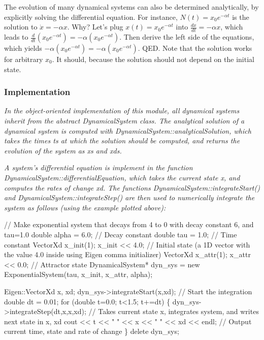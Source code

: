 The evolution of many dynamical systems can also be determined analytically, by explicitly solving the differential equation. For instance, $N(t) = x_0e^{-\alpha t}$ is the solution to $\dot{x} = -\alpha x$. Why? Let's plug $x(t) = x_0e^{-\alpha t}$ into $\frac{dx}{dt} = -\alpha x$, which leads to $\frac{d}{dt}(x_0e^{-\alpha t}) = -\alpha (x_0e^{-\alpha t})$. Then derive the left side of the equations, which yields $-\alpha(x_0e^{-\alpha t}) = -\alpha (x_0e^{-\alpha t})$. Q\+E\+D. Note that the solution works for arbitrary $x_0$. It should, because the solution should not depend on the initial state.\hypertarget{page_dyn_sys_dynsys_implementation1}{}\subsubsection{Implementation}\label{page_dyn_sys_dynsys_implementation1}
{\itshape  In the object-\/oriented implementation of this module, all dynamical systems inherit from the abstract Dynamical\+System class. The analytical solution of a dynamical system is computed with Dynamical\+System\+::analytical\+Solution, which takes the times {\ttfamily ts} at which the solution should be computed, and returns the evolution of the system as {\ttfamily xs} and {\ttfamily xds}.}

{\itshape A system's differential equation is implement in the function Dynamical\+System\+::differential\+Equation, which takes the current state {\ttfamily x}, and computes the rates of change {\ttfamily xd}. The functions Dynamical\+System\+::integrate\+Start() and Dynamical\+System\+::integrate\+Step() are then used to numerically integrate the system as follows (using the example plotted above)\+:}

{\itshape 
\begin{DoxyCode}
\textcolor{comment}{// Make exponential system that decays from 4 to 0 with decay constant 6, and tau=1.0}
\textcolor{keywordtype}{double} alpha = 6.0;                \textcolor{comment}{// Decay constant}
\textcolor{keywordtype}{double} tau = 1.0;                  \textcolor{comment}{// Time constant }
VectorXd x\_init(1); x\_init << 4.0; \textcolor{comment}{// Initial state (a 1D vector with the value 4.0 inside using Eigen
       comma initializer)}
VectorXd x\_attr(1); x\_attr << 0.0; \textcolor{comment}{// Attractor state}
DynamicalSystem* dyn\_sys = \textcolor{keyword}{new} ExponentialSystem(tau, x\_init, x\_attr, alpha);

Eigen::VectorXd x, xd;
dyn\_sys->integrateStart(x,xd); \textcolor{comment}{// Start the integration}
\textcolor{keywordtype}{double} dt = 0.01;
\textcolor{keywordflow}{for} (\textcolor{keywordtype}{double} t=0.0; t<1.5; t+=dt)
\{
  dyn\_sys->integrateStep(dt,x,x,xd);          \textcolor{comment}{// Takes current state x, integrates system, and writes next
       state in x, xd}
  cout << t << \textcolor{stringliteral}{" "} << x << \textcolor{stringliteral}{" "} << xd << endl; \textcolor{comment}{// Output current time, state and rate of change}
\}
\textcolor{keyword}{delete} dyn\_sys;
\end{DoxyCode}
}

